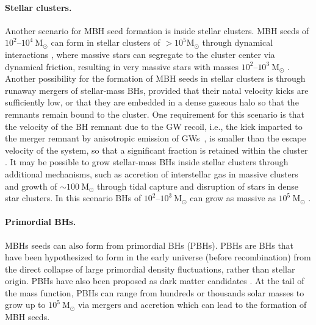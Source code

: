 \documentclass[a4paper,12pt]{article}
\begin{document}
\paragraph{Stellar clusters.}
Another scenario for MBH seed formation is inside stellar clusters. MBH seeds of $10^{2}$--$10^{4}~\mathrm{M}_{\odot}$ can form in stellar clusters of $>10^{5} \text{M}_{\odot}$ through dynamical interactions \cite{omukai2008can, devecchi2009formation, reinoso2018collisions}, where massive stars can segregate to the cluster center via dynamical friction, resulting in very massive stars with masses $10^{2}$--$10^{3}~\mathrm{M}_{\odot}$ \cite{zwart2002runaway,portegies2004formation, gurkan2004formation,freitag2006runaway}. Another possibility for the formation of MBH seeds in stellar clusters is through runaway mergers of stellar-mass BHs, provided that their natal velocity kicks are sufficiently low, or that they are embedded in a dense gaseous halo \cite{belczynski2002comprehensive} so that the remnants remain bound to the cluster. One requirement for this scenario is that the velocity of the BH remnant due to the GW recoil, i.e., the kick imparted to the merger remnant by anisotropic emission of GWs~\cite{campanelli2007large}, is smaller than the escape velocity of the system, so that a significant fraction is retained within the cluster \cite{holley2008gravitational, davies2011supermassive, miller2012upper, sesana2014linking}. It may be possible to grow stellar-mass BHs inside stellar clusters through additional mechanisms, such as accretion of interstellar gas in massive clusters~\cite{leigh2013gas, natarajan2021new} and growth of $\sim100~\mathrm{M}_{\odot}$ through tidal capture and disruption of stars in dense star clusters. In this scenario BHs of $10^{2}$--$10^{3}~\mathrm{M}_{\odot}$ can grow as massive as $10^{5}~\mathrm{M}_{\odot}$ \cite{rosswog2009tidal, macleod2016optical, sakurai2019growth}.

\paragraph{Primordial BHs.}
MBHs seeds can also form from primordial BHs (PBHs). PBHs are BHs that have been hypothesized to form in the early universe (before recombination) from the direct collapse of large primordial density fluctuations, rather than stellar origin. PBHs have also been proposed as dark matter candidates \cite{carr2020primordial}. At the tail of the mass function, PBHs can range from hundreds or thousands solar masses to grow up to $10^{5}~\mathrm{M}_{\odot}$ via mergers and accretion \cite{mack2007growth,ali2017merger,serpico2020cosmic} which can lead to the formation of MBH seeds.
\end{document}
